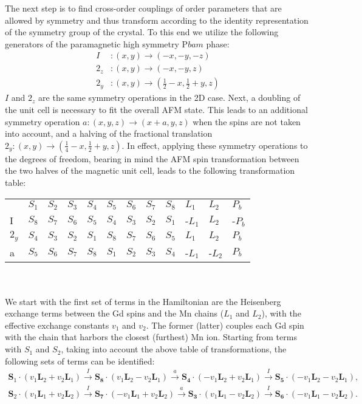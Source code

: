 The next step is to find cross-order couplings of order parameters that are allowed by symmetry and thus transform according to the identity representation of the symmetry group of the crystal.
To this end we utilize the following generators of the paramagnetic high symmetry P$bam$ phase:
\begin{align}
	I &: (x, y) \rightarrow (-x, -y, -z)\\
	2_z &: (x, y) \rightarrow (-x, -y, z)\\
	2_y &: (x, y) \rightarrow (\frac{1}{2} - x, \frac{1}{2} + y, z)
\end{align}
$I$ and $2_z$ are the same symmetry operations in the 2D case. Next, a doubling of the unit cell is necessary to fit the overall AFM state. This leads to an additional symmetry operation $a: (x, y, z) \rightarrow (x + a, y, z)$ when the spins are not taken into account, and a halving of the fractional translation $2_y: (x, y) \rightarrow (\frac{1}{4} - x, \frac{1}{2}+y, z)$.
In effect, applying these symmetry operations to the degrees of freedom, bearing in mind the AFM spin transformation between the two halves of the magnetic unit cell, leads to the following transformation table:
\begin{table}[h]
\centering
\begin{tabular}{|l|lllllllllll|}
\cline{1-12}
 & $S_1$ & $S_2$ & $S_3$ & $S_4$ & $S_5$ & $S_6$ & $S_7$ & $S_8$ & $L_1$ & $L_2$ & $P_b$ \\ \cline{1-12}
I & $S_8$ & $S_7$ & $S_6$ & $S_5$ & $S_4$ & $S_3$ & $S_2$ & $S_1$ & -$L_1$ & $L_2$ & -$P_b$ \\ \cline{1-12}
$2_y$ & $S_4$ & $S_3$ & $S_2$ & $S_1$ & $S_8$ & $S_7$ & $S_6$ & $S_5$ & $L_1$ & $L_2$ & $P_b$ \\ \cline{1-12}
a & $S_5$ & $S_6$ & $S_7$ & $S_8$ & $S_1$ & $S_2$ & $S_3$ & $S_4$ & -$L_1$ & -$L_2$ & $P_b$ \\ \cline{1-12}
\end{tabular}
\end{table}\\\\
We start with the first set of terms in the Hamiltonian are the Heisenberg exchange terms between the Gd spins and the Mn chains ($L_1$ and $L_2$), with the effective exchange constants $v_1$ and $v_2$.
The former (latter) couples each Gd spin with the chain that harbors the closest (furthest) Mn ion.
Starting from terms with $S_1$ and $S_2$, taking into account the above table of transformations, the following sets of terms can be identified:
\begin{align}
	\mathbf{S}_1\cdot(v_1 \mathbf{L}_2 + v_2 \mathbf{L}_1) \xrightarrow{I} \mathbf{S_8}\cdot(v_1 \mathbf{L}_2 - v_2 \mathbf{L}_1) \xrightarrow{a} \mathbf{S_4} \cdot (- v_1 \mathbf{L}_2 + v_2 \mathbf{L}_1) \xrightarrow{I} \mathbf{S_5} \cdot (-v_1 \mathbf{L}_2 - v_2 \mathbf{L}_1), \nonumber\\
	\mathbf{S}_2\cdot(v_1 \mathbf{L}_1 + v_2 \mathbf{L}_2) \xrightarrow{I} \mathbf{S_7}\cdot(-v_1 \mathbf{L}_1 + v_2 \mathbf{L}_2) \xrightarrow{a} \mathbf{S_3} \cdot (v_1 \mathbf{L}_1 - v_2 \mathbf{L}_2) \xrightarrow{I} \mathbf{S_6} \cdot (-v_1 \mathbf{L}_1 - v_2 \mathbf{L}_2).
\end{align}
